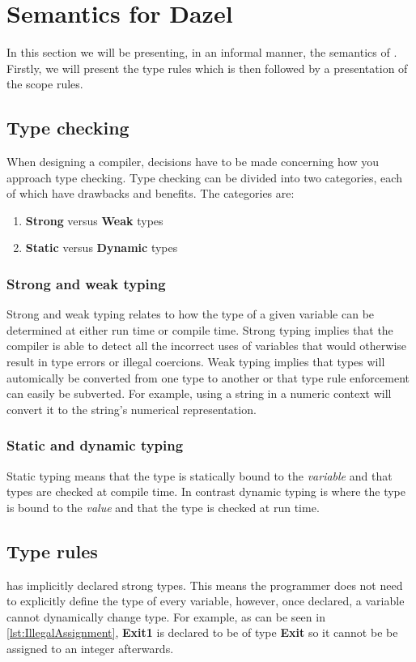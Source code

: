 \section{Semantics for Dazel}

In this section we will be presenting, in an informal manner, the semantics of \dazel.
Firstly, we will present the type rules which is then followed by a presentation of the scope rules.

\subsection*{Type checking}

When designing a compiler, decisions have to be made concerning how you approach type checking. Type checking can be divided into two categories, each of which have
drawbacks and benefits. The categories are:

\begin{enumerate}
	\item \textbf{Strong} versus \textbf{Weak} types
	\item \textbf{Static} versus \textbf{Dynamic} types
\end{enumerate}

\subsubsection*{Strong and weak typing}
Strong and weak typing relates to how the type of a given variable can be determined at either run time or compile time. Strong typing implies that the compiler is
able to detect all the incorrect uses of variables that would otherwise result in type errors or illegal coercions.
Weak typing implies that types will automically be converted from one type to another or that type rule enforcement can easily be subverted.
For example, using a string in a numeric context will convert it to the string's numerical representation.

\subsubsection*{Static and dynamic typing}
Static typing means that the type is statically bound to the \emph{variable} and that types are checked at compile time.
In contrast dynamic typing is where the type is bound to the \emph{value} and that the type is checked at run time.


\subsection*{Type rules}
\dazel has implicitly declared strong types.
This means the programmer does not need to explicitly define the type of every variable, however, once declared, a variable
cannot dynamically change type.
For example, as can be seen in \ref{lst:IllegalAssignment}, \textbf{Exit1} is declared to be of type \textbf{Exit} so it cannot be be
assigned to an integer afterwards.

